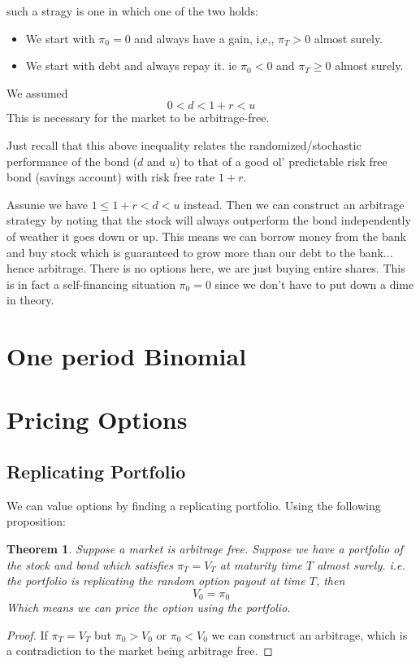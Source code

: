\documentclass{article}
\newtheorem{theorem}{Theorem}
\begin{document}
such a stragy is one in which one of the two holds:
\begin{itemize}
\item We start with $\pi_0 = 0$ and always have a gain, i,e,, $\pi_T > 0$ almost surely. 
\item We start with debt and always repay it. ie $\pi_0 < 0$ and $\pi_T \geq 0$ almost surely.
\end{itemize}

We assumed 
\[ 0 < d< 1+r< u \]
This is necessary for the market to be arbitrage-free. 

Just recall that this above inequality relates the randomized/stochastic performance of the bond ($d$ and $u$) to that of a good ol' predictable risk free bond (savings account) with risk free rate $1+r$. 

Assume we have $1 \leq 1+r < d < u$ instead. Then we can construct an arbitrage strategy by noting that the stock will always outperform the bond independently of weather it goes down or up. This means we can borrow money from the bank and buy stock which is guaranteed to grow more than our debt to the bank... hence arbitrage. There is no options here, we are just buying entire shares. This is in fact a self-financing situation $\pi_0 = 0$ since we don't have to put down a dime in theory. 



\section{One period Binomial}

\section{Pricing Options}
\subsection{Replicating Portfolio}
We can value options by finding a replicating portfolio. Using the following proposition:

\begin{theorem}
Suppose a market is arbitrage free. Suppose we have a portfolio of the stock and bond which satisfies $\pi_T = V_T$ at maturity time $T$ almost surely. i.e. the portfolio is replicating the random option payout at time $T$, then
\[ V_0 = \pi_0\]
Which means we can price the option using the portfolio.
\end{theorem}
\begin{proof}
If $\pi_T = V_T$ but $\pi_0 > V_0$ or $\pi_0 < V_0$ we can construct an arbitrage, which is a contradiction to the market being arbitrage free. 
\end{proof}
\end{document}
